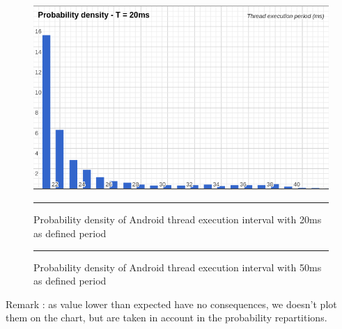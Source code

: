 \begin{figure}[h]
  \begin{minipage}[c]{.46\linewidth}
    \centering
 \includegraphics[width=\textwidth, height=.70\linewidth]{Pictures/dsp20.png}
    \label{fig:dsp20}
    \rule{16em}{0.5pt}
    \caption[Probability density of Android thread execution interval with 20ms as defined period]{Probability density of Android thread execution interval with 20ms as defined period}
  \end{minipage}
  \hfill%
  \begin{minipage}[c]{.46\linewidth}
    \label{fig:dsp50}
    \rule{16em}{0.5pt}
    \caption[Probability density of Android thread execution interval with 50ms as defined period]{Probability density of Android thread execution interval with 50ms as defined period}
  \end{minipage}
  
\end{figure}
\begin{center}
Remark : as value lower than expected have no consequences, we doesn't plot them on the chart, but are taken in account in the probability repartitions.
\end{center}

